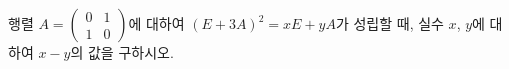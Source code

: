 \hspace*{2mm}\begin{minipage}[t]{\dimexpr\linewidth-2mm\relax}\vspace{0pt}
행렬 $A=\begin{pmatrix} 0 & 1 \\ 1 & 0 \end{pmatrix}$에 대하여 $(E+3A)^2=xE+yA$가 성립할 때, 실수 $x$, $y$에 대하여 $x-y$의 값을 구하시오. \end{minipage}
